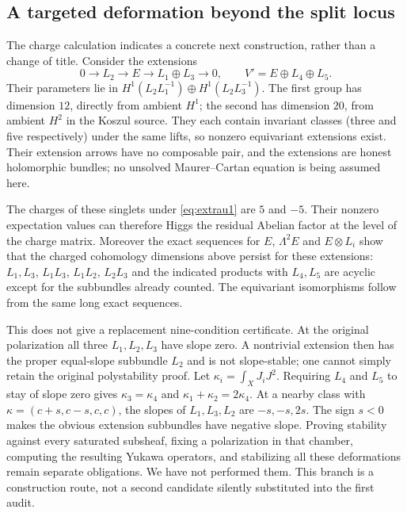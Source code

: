\subsection{A targeted deformation beyond the split locus}
The charge calculation indicates a concrete next construction, rather
than a change of title. Consider the extensions
\[
 0\longrightarrow L_2\longrightarrow E
 \longrightarrow L_1\oplus L_3\longrightarrow0,
 \qquad V'=E\oplus L_4\oplus L_5.
\]
Their parameters lie in
$H^1(L_2L_1^{-1})\oplus H^1(L_2L_3^{-1})$.
The first group has dimension $12$, directly from ambient $H^1$;
the second has dimension $20$, from ambient $H^2$ in the Koszul source.
They each contain invariant classes (three and five respectively) under
the same lifts, so nonzero equivariant extensions exist. Their extension
arrows have no composable pair, and the extensions are honest holomorphic
bundles; no unsolved Maurer--Cartan equation is being assumed here.

The charges of these singlets under \eqref{eq:extrau1} are $5$ and $-5$.
Their nonzero expectation values can therefore Higgs the residual
Abelian factor at the level of the charge matrix. Moreover the exact
sequences for $E$, $\Lambda^2E$ and $E\otimes L_i$ show that the charged
cohomology dimensions above persist for these extensions: $L_1,L_3$,
$L_1L_3$, $L_1L_2$, $L_2L_3$ and the indicated products with $L_4,L_5$
are acyclic except for the subbundles already counted. The equivariant
isomorphisms follow from the same long exact sequences.

This does not give a replacement nine-condition certificate. At the
original polarization all three $L_1,L_2,L_3$ have slope zero. A nontrivial
extension then has the proper equal-slope subbundle $L_2$ and is not
slope-stable; one cannot simply retain the original polystability proof.
Let $\kappa_i=\int_XJ_iJ^2$. Requiring $L_4$ and $L_5$ to stay of slope
zero gives $\kappa_3=\kappa_4$ and
$\kappa_1+\kappa_2=2\kappa_4$. At a nearby class with
$\kappa=(c+s,c-s,c,c)$, the slopes of $L_1,L_3,L_2$ are
$-s,-s,2s$. The sign $s<0$ makes the obvious extension subbundles have
negative slope. Proving stability against every saturated subsheaf,
fixing a polarization in that chamber, computing the resulting Yukawa
operators, and stabilizing all these deformations remain separate
obligations. We have not performed them. This branch is a construction
route, not a second candidate silently substituted into the first audit.

